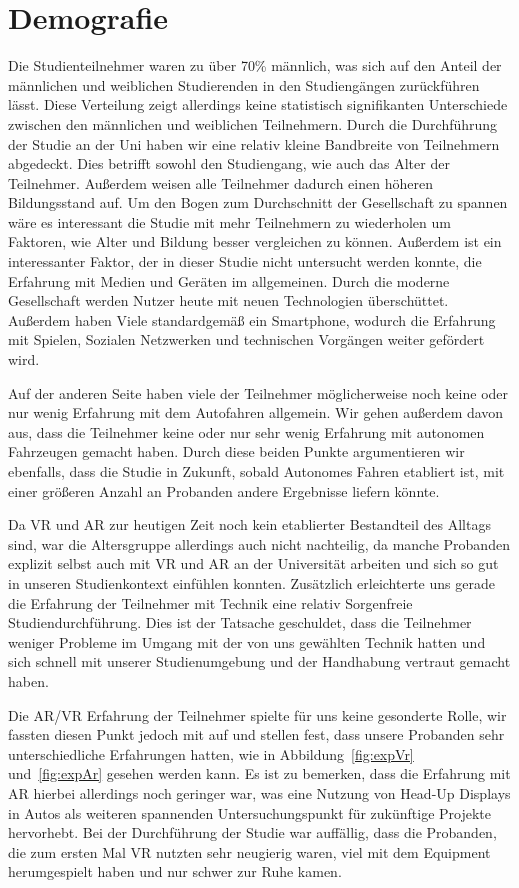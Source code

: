 \section{Demografie}

Die Studienteilnehmer waren zu über 70\% männlich, was sich auf den Anteil der männlichen und weiblichen Studierenden in den Studiengängen zurückführen lässt. Diese Verteilung zeigt allerdings keine statistisch signifikanten Unterschiede zwischen den männlichen und weiblichen Teilnehmern.
Durch die Durchführung der Studie an der Uni haben wir eine relativ kleine Bandbreite von Teilnehmern abgedeckt. Dies betrifft sowohl den Studiengang, wie auch das Alter der Teilnehmer. Außerdem weisen alle Teilnehmer dadurch einen höheren Bildungsstand auf. 
Um den Bogen zum Durchschnitt der Gesellschaft zu spannen wäre es interessant die Studie mit mehr Teilnehmern zu wiederholen um Faktoren, wie Alter und Bildung besser vergleichen zu können.
Außerdem ist ein interessanter Faktor, der in dieser Studie nicht untersucht werden konnte, die Erfahrung mit Medien und Geräten im allgemeinen. 
Durch die moderne Gesellschaft werden Nutzer heute mit neuen Technologien überschüttet. Außerdem haben Viele standardgemäß ein Smartphone, wodurch die Erfahrung mit Spielen, Sozialen Netzwerken und technischen Vorgängen weiter gefördert wird.

Auf der anderen Seite haben viele der Teilnehmer möglicherweise noch keine oder nur wenig Erfahrung mit dem Autofahren allgemein. Wir gehen außerdem davon aus, dass die Teilnehmer keine oder nur sehr wenig Erfahrung mit autonomen Fahrzeugen gemacht haben. Durch diese beiden Punkte argumentieren wir ebenfalls, dass die Studie in Zukunft, sobald Autonomes Fahren etabliert ist, mit einer größeren Anzahl an Probanden andere Ergebnisse liefern könnte. 

Da VR und AR zur heutigen Zeit noch kein etablierter Bestandteil des Alltags sind, war die Altersgruppe allerdings auch nicht nachteilig, da manche Probanden explizit selbst auch mit VR und AR an der Universität arbeiten und sich so gut in unseren Studienkontext einfühlen konnten.
Zusätzlich erleichterte uns gerade die Erfahrung der Teilnehmer mit Technik eine relativ Sorgenfreie Studiendurchführung. Dies ist der Tatsache geschuldet, dass die Teilnehmer weniger Probleme im Umgang mit der von uns gewählten Technik hatten und sich schnell mit unserer Studienumgebung und der Handhabung vertraut gemacht haben.

Die AR/VR Erfahrung der Teilnehmer spielte für uns keine gesonderte Rolle, wir fassten diesen Punkt jedoch mit auf und stellen fest, dass unsere Probanden sehr unterschiedliche Erfahrungen hatten, wie in Abbildung~\ref{fig:expVr} und~\ref{fig:expAr} gesehen werden kann. Es ist zu bemerken, dass die Erfahrung mit AR hierbei allerdings noch geringer war, was eine Nutzung von Head-Up Displays in Autos als weiteren spannenden Untersuchungspunkt für zukünftige Projekte hervorhebt. 
Bei der Durchführung der Studie war auffällig, dass die Probanden, die zum ersten Mal VR nutzten sehr neugierig waren, viel mit dem Equipment herumgespielt haben und nur schwer zur Ruhe kamen.

